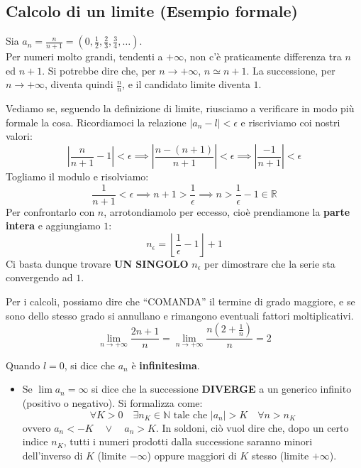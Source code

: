 \documentclass[12pt]{report}
\newcommand{\N}{\mathbb{N}}
\newcommand{\R}{\mathbb{R}}
\begin{document}
	\subsection*{Calcolo di un limite (Esempio formale)}
	Sia $a_n = \frac{n}{n+1} = \left(0, \frac{1}{2}, \frac{2}{3}, \frac{3}{4}, \dots \right)$.\\
	Per numeri molto grandi, tendenti a $+\infty$, non c'è praticamente differenza tra $n$ ed $n+1$. Si potrebbe dire che, per $n \to +\infty$, $n \simeq n+1$.
	La successione, per $n \to +\infty$, diventa quindi $\frac{n}{n}$, e il candidato limite diventa $1$.
	
	Vediamo se, seguendo la definizione di limite, riusciamo a verificare in modo più formale la cosa. Ricordiamoci la relazione $|a_n - l| < \epsilon$ e riscriviamo coi nostri valori:
	\[
	\left| \frac{n}{n+1} - 1 \right| < \epsilon \implies \left| \frac{n - (n+1)}{n+1} \right| < \epsilon \implies \left| \frac{-1}{n+1} \right| < \epsilon
	\]
	Togliamo il modulo e risolviamo:
	\[
	\frac{1}{n+1} < \epsilon \implies n+1 > \frac{1}{\epsilon} \implies n > \frac{1}{\epsilon} - 1 \in \R
	\]
	Per confrontarlo con $n$, arrotondiamolo per eccesso, cioè prendiamone la \textbf{parte intera} e aggiungiamo $1$:
	\[
	n_\epsilon = \left\lfloor \frac{1}{\epsilon} - 1 \right\rfloor + 1
	\]
	Ci basta dunque trovare \textbf{UN SINGOLO} $n_\epsilon$ per dimostrare che la serie sta convergendo ad $1$.
	
	Per i calcoli, possiamo dire che ``COMANDA'' il termine di grado maggiore, e se sono dello stesso grado si annullano e rimangono eventuali fattori moltiplicativi.
	\[
	\lim_{n \to +\infty} \frac{2n+1}{n} = \lim_{n \to +\infty} \frac{n\left(2 + \frac{1}{n}\right)}{n} = 2
	\]
	\begin{osservazione}{}{}
		Quando $l=0$, si dice che $a_n$ è \textbf{infinitesima}.
	\end{osservazione}
	
	\begin{itemize}
		\item Se $\lim a_n = \infty$ si dice che la successione \textbf{DIVERGE} a un generico infinito (positivo o negativo).
		Si formalizza come:
		\[
		\forall K > 0 \quad \exists n_K \in \N \text{ tale che } |a_n| > K \quad \forall n > n_K
		\]
		ovvero $a_n < -K \quad \lor \quad a_n > K$.
		In soldoni, ciò vuol dire che, dopo un certo indice $n_K$, tutti i numeri prodotti dalla successione saranno minori dell'inverso di $K$ (limite $-\infty$) oppure maggiori di $K$ stesso (limite $+\infty$).
	\end{itemize}
	
\end{document}
